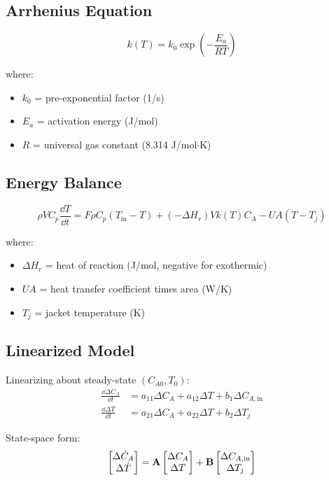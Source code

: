 \subsection{Arrhenius Equation}

\begin{equation}
k(T) = k_0 \exp\left(-\frac{E_a}{RT}\right)
\end{equation}

where:
\begin{itemize}
    \item $k_0$ = pre-exponential factor (1/s)
    \item $E_a$ = activation energy (J/mol)
    \item $R$ = universal gas constant (8.314 J/mol$\cdot$K)
\end{itemize}

\subsection{Energy Balance}

\begin{equation}
\rho V C_p\frac{\dd T}{\dd t} = F\rho C_p(T_{\text{in}} - T) + (-\Delta H_r)Vk(T)C_A - UA(T - T_j)
\end{equation}

where:
\begin{itemize}
    \item $\Delta H_r$ = heat of reaction (J/mol, negative for exothermic)
    \item $UA$ = heat transfer coefficient times area (W/K)
    \item $T_j$ = jacket temperature (K)
\end{itemize}

\subsection{Linearized Model}

Linearizing about steady-state $(C_{A0}, T_0)$:
\begin{align}
\frac{\dd \Delta C_A}{\dd t} &= a_{11}\Delta C_A + a_{12}\Delta T + b_1\Delta C_{A,\text{in}} \\
\frac{\dd \Delta T}{\dd t} &= a_{21}\Delta C_A + a_{22}\Delta T + b_2\Delta T_j
\end{align}

State-space form:
\begin{equation}
\begin{bmatrix} \Delta\dot{C}_A \\ \Delta\dot{T} \end{bmatrix} = \mathbf{A} \begin{bmatrix} \Delta C_A \\ \Delta T \end{bmatrix} + \mathbf{B} \begin{bmatrix} \Delta C_{A,\text{in}} \\ \Delta T_j \end{bmatrix}
\end{equation}

